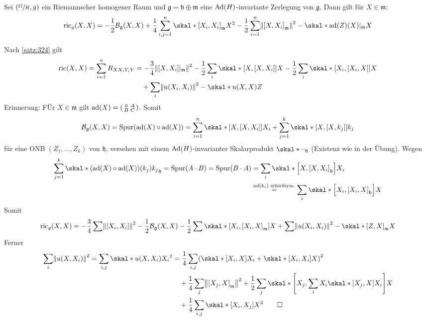\begin{satz}
	Sei $\enbrace*{\sfrac{G}{H},g}$ ein Riemannscher homogener Raum und $\mathfrak{g} = \mathfrak{h} \oplus \mathfrak{m}$ eine $\Ad(H)$-invariante Zerlegung von $\mathfrak{g}$.
	Dann gilt für $X \in \mathfrak{m}$:
	\[
		\operatorname{ric}_g(X,X) = - \frac{1}{2} \mathcal{B}_\mathfrak{g}(X,X) + \frac{1}{4} \sum_{i,j=1}^n \skal*{\benbrace*{X_i,X_i}_\mathfrak{m}}{X}^2 - \frac{1}{2} \sum_{i=1}^{n} \norm*{\benbrace*{X,X_i}_\mathfrak{m}}^2 - \skal*{\ad(Z)(X)|_\mathfrak{m}}{X}
	\]
\end{satz}
\begin{beweis}
	Nach \autoref{satz:324} gilt 
	\begin{align}
		\operatorname{ric}(X,X) = \sum_{i=1}^{n} R_{XX_iY_iY} &= - \frac{3}{4} \norm*{\benbrace*{X,X_i}|_\mathfrak{m}}^2 - \frac{1}{2} \sum_{i} \skal*{\benbrace*{X,\benbrace*{X,X_i}}}{X} - \frac{1}{2} \sum_i \skal*{\benbrace*{X_i,\benbrace*{X_i,X}}}{X} \\
		& \quad + \sum_i \norm*{u(X_i,X_i)}^2 - \skal*{u(X,X)}{Z}
	\end{align}
	Erinnerung: FÜr $X \in \mathfrak{m}$ gilt $\ad(X) = \begin{psmallmatrix}
		0 & A \\ B & C
	\end{psmallmatrix}$.
	Somit
	\begin{align}
		\mathcal{B}_\mathfrak{g}(X,X) = \operatorname{Spur} \enbrace*{\ad(X) \circ \ad(X)} = \sum_{i=1}^{n} \skal*{\benbrace*{X,\benbrace*{X,X_i}}}{X_i} + \sum_{j=1}^{k} \skal*{\benbrace*{X, \benbrace*{X,k_j}}}{k_j}
	\end{align}
	für eine ONB $(Z_1, \ldots ,Z_k)$ von $\mathfrak{h}$, versehen mit einem $\Ad(H)$-invarianter Skalarprodukt $\skal*{\cdot }{\cdot }_\mathfrak{h}$ (Existenz wie in der Übung).
	Wegen 
	\begin{align}
		\sum_{j=1}^{k} \skal*{\enbrace*{\ad(X) \circ \ad(X)}(k_j)}{k_j}_\mathfrak{h} = \operatorname{Spur}(A \cdot B) = \operatorname{Spur}(B \cdot A) &= \sum_i \skal*{\benbrace*{X, \benbrace*{X,X_i}_\mathfrak{h}}}{X_i} \\
		&\StackText{$\ad(k_i)$ schiefsym.}{= }\sum_i \skal*{\benbrace*{X_i , \benbrace*{X_i,X}_\mathfrak{h}}}{X}
	\end{align}
	Somit 
	\begin{align}
		\operatorname{ric}_g(X,X) = -\frac{3}{4}  \sum \norm*{\benbrace*{X_i,X_i}}^2 - \frac{1}{2} \mathcal{B}_\mathfrak{g}(X,X) - \frac{1}{2} \sum \skal*{\benbrace*{X_i , \benbrace*{X_i,X}_\mathfrak{m}}}{X} + \sum \norm*{u(X_i,X_i)}^2 - \skal*{\benbrace*{Z,X}_\mathfrak{m}}{X}
	\end{align}
	Ferner
	\begin{align}
		\sum_i \norm*{u(X,X_i)}^2 = \sum_{i,j} \skal*{u(X,X_i)}{X_i}^2 &= \frac{1}{4} \sum_{i,j} \enbrace*{\skal*{\benbrace*{X_i,X}}{X_i} + \skal*{\benbrace*{X_i,X_i}}{X}}^2 \\
		& \quad + \frac{1}{4} \sum_j \norm*{\benbrace*{X_j,X}_\mathfrak{m}}^2  + \frac{1}{2} \sum_j \skal*{\benbrace*{X_j, \sum_i X_i \skal*{\benbrace*{X_j,X}}{X_i}}}{X} \\
		& \quad + \frac{1}{4}  \sum_{i,j} \skal*{\benbrace*{X_i,X_j}}{X}^2 \qedhere 
	\end{align}
\end{beweis}
